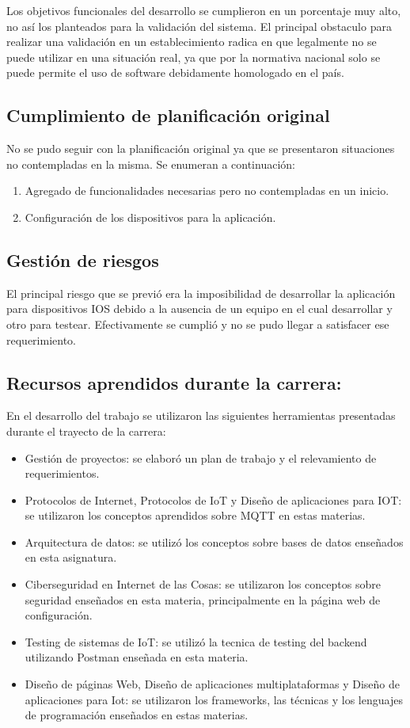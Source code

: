 Los objetivos funcionales del desarrollo se cumplieron en un porcentaje muy alto, no así los planteados para la validación del sistema. El principal obstaculo para realizar una validación en un establecimiento radica en que legalmente no se puede utilizar en una situación real, ya que por la normativa nacional solo se puede permite el uso de software debidamente homologado en el país.  

\subsection{Cumplimiento de planificación original}

No se pudo seguir con la planificación original ya que se presentaron situaciones no contempladas en la misma. Se enumeran a continuación:
\begin{enumerate}
\item Agregado de funcionalidades necesarias pero no contempladas en un inicio.
\item Configuración de los dispositivos para la aplicación.

\end{enumerate}


\subsection{Gestión de riesgos}

El principal riesgo que se previó era la imposibilidad de desarrollar la aplicación para dispositivos IOS debido a la ausencia de un equipo en el cual desarrollar y otro para testear. Efectivamente se cumplió y no se pudo llegar a satisfacer ese requerimiento.

\subsection{Recursos aprendidos durante la carrera:}
En el desarrollo del trabajo se utilizaron las siguientes herramientas presentadas durante el trayecto de la carrera:

\begin{itemize}
\item Gestión de proyectos: se elaboró un plan de trabajo y el relevamiento de requerimientos.
\item Protocolos de Internet, Protocolos de IoT y Diseño de aplicaciones para IOT: se utilizaron los conceptos aprendidos sobre MQTT en estas materias.
\item Arquitectura de datos: se utilizó los conceptos sobre bases de datos enseñados en esta asignatura.
\item Ciberseguridad en Internet de las Cosas: se utilizaron los conceptos sobre seguridad enseñados en esta materia, principalmente en la página web de configuración.
\item Testing de sistemas de IoT: se utilizó la tecnica de testing del backend utilizando Postman enseñada en esta materia.
\item Diseño de páginas Web, Diseño de aplicaciones multiplataformas y Diseño de aplicaciones para Iot: se utilizaron los frameworks, las técnicas y los lenguajes de programación enseñados en estas materias.
\end{itemize}

